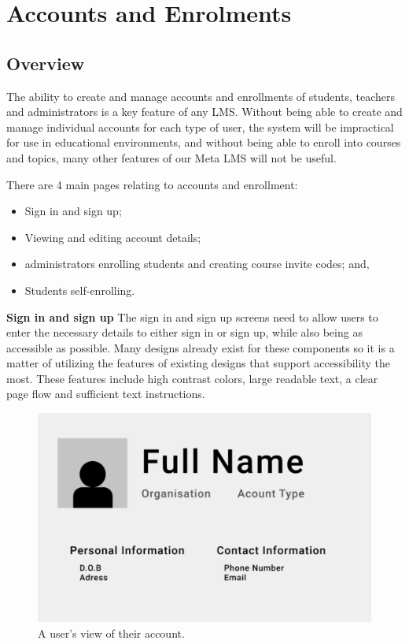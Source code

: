 \section{Accounts and Enrolments}
\subsection{Overview}
The ability to create and manage accounts and enrollments of students, teachers and administrators is a key feature of any LMS. Without being able to create and manage individual accounts for each type of user, the system will be impractical for use in educational environments, and without being able to enroll into courses and topics, many other features of our Meta LMS will not be useful.

There are 4 main pages relating to accounts and enrollment:
\begin{itemize}
  \item Sign in and sign up;
  \item Viewing and editing account details;
  \item administrators enrolling students and creating course invite codes; and,
  \item Students self-enrolling.
\end{itemize}

\textbf{Sign in and sign up}
The sign in and sign up screens need to allow users to enter the necessary details to either sign in or sign up, while also being as accessible as possible. Many designs already exist for these components so it is a matter of utilizing the features of existing designs that support accessibility the most. These features include high contrast colors, large readable text, a clear page flow and sufficient text instructions.

\begin{figure}[h!]
  \centering
  \includegraphics[scale=0.2]{images/accounts-profile}
  \caption{A user's view of their account.}
\end{figure}

